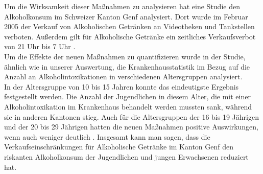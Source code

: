 \documentclass[12pt]{article}
\begin{document}
Um die Wirksamkeit dieser Maßnahmen zu analysieren hat eine Studie den Alkoholkonsum im Schweizer Kanton Genf analysiert. Dort wurde im Februar 2005 der Verkauf von Alkoholischen Getränken an Videotheken und Tankstellen verboten. Außerdem gilt für Alkoholische Getränke ein zeitliches Verkaufsverbot von 21 Uhr bis 7 Uhr \autocite[27]{hagen_verkaufseinschrankungen_2011}. \\%
Um die Effekte der neuen Maßnahmen zu quantifizieren wurde in der Studie, ähnlich wie in unserer Auswertung, die Krankenhausstatistik im Bezug auf die Anzahl an Alkoholintoxikationen in verschiedenen Altersgruppen analysiert.\\
In der Altersgruppe von 10 bis 15 Jahren konnte das eindeutigste Ergebnis festgestellt werden. Die Anzahl der Jugendlichen in diesem Alter, die mit einer Alkoholintoxikation im Krankenhaus behandelt werden mussten sank, während sie in anderen Kantonen stieg. Auch für die Altersgruppen der 16 bis 19 Jährigen und der 20 bis 29 Jährigen hatten die neuen Maßnahmen positive Auswirkungen, wenn auch weniger deutlich \autocite[28]{hagen_verkaufseinschrankungen_2011}. Insgesamt kann man sagen, dass die Verkaufseinschränkungen für Alkoholische Getränke im Kanton Genf den riskanten Alkoholkonsum der Jugendlichen und jungen Erwachsenen reduziert hat. 
\end{document}
